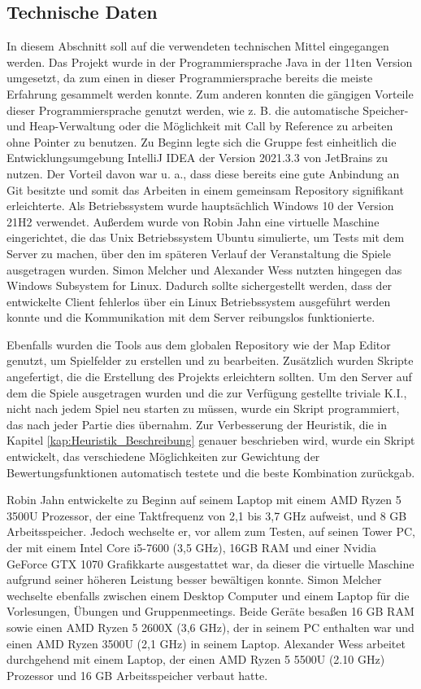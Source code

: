 \documentclass[12pt,a4paper,bibliography=totocnumbered,listof=totocnumbered]{article}
\begin{document}
\subsection{Technische Daten}
In diesem Abschnitt soll auf die verwendeten technischen Mittel eingegangen werden. Das Projekt wurde in der Programmiersprache Java in der 11ten Version umgesetzt, da zum einen in dieser Programmiersprache bereits die meiste Erfahrung gesammelt werden konnte. Zum anderen konnten die gängigen Vorteile dieser Programmiersprache genutzt werden, wie z. B. die automatische Speicher- und Heap-Verwaltung oder die Möglichkeit mit \glqq Call by Reference\grqq{} zu arbeiten ohne Pointer zu benutzen.
Zu Beginn legte sich die Gruppe fest einheitlich die Entwicklungsumgebung IntelliJ IDEA der Version 2021.3.3 von JetBrains zu nutzen. Der Vorteil davon war u. a., dass diese bereits eine gute Anbindung an Git besitzte und somit das Arbeiten in einem gemeinsam Repository signifikant erleichterte.
Als Betriebssystem wurde hauptsächlich Windows 10 der Version 21H2 verwendet. Außerdem wurde von Robin Jahn eine virtuelle Maschine eingerichtet, die das Unix Betriebssystem Ubuntu simulierte, um Tests mit dem Server zu machen, über den im späteren Verlauf der Veranstaltung die Spiele ausgetragen wurden. Simon Melcher und Alexander Wess nutzten hingegen das Windows Subsystem for Linux. Dadurch sollte sichergestellt werden, dass der entwickelte Client fehlerlos über ein Linux Betriebssystem ausgeführt werden konnte und die Kommunikation mit dem Server reibungslos funktionierte.

Ebenfalls wurden die Tools aus dem globalen Repository wie der Map Editor genutzt, um Spielfelder zu erstellen und zu bearbeiten. Zusätzlich wurden Skripte angefertigt, die die Erstellung des Projekts erleichtern sollten. Um den Server auf dem die Spiele ausgetragen wurden und die zur Verfügung gestellte triviale K.I., nicht nach jedem Spiel neu starten zu müssen, wurde ein Skript programmiert, das nach jeder Partie dies übernahm. Zur Verbesserung der Heuristik, die in Kapitel \ref{kap:Heuristik_Beschreibung} genauer beschrieben wird, wurde ein Skript entwickelt, das verschiedene Möglichkeiten zur Gewichtung der Bewertungsfunktionen automatisch testete und die beste Kombination zurückgab.

Robin Jahn entwickelte zu Beginn auf seinem Laptop mit einem AMD Ryzen 5 3500U Prozessor, der eine Taktfrequenz von 2,1 bis 3,7 GHz aufweist, und 8 GB Arbeitsspeicher. Jedoch wechselte er, vor allem zum Testen, auf seinen Tower PC, der mit einem Intel Core i5-7600 (3,5 GHz), 16GB RAM und einer Nvidia GeForce GTX 1070 Grafikkarte ausgestattet war, da dieser die virtuelle Maschine aufgrund seiner höheren Leistung besser bewältigen konnte. Simon Melcher wechselte ebenfalls zwischen einem Desktop Computer und einem Laptop für die Vorlesungen, Übungen und Gruppenmeetings. Beide Geräte besaßen 16 GB RAM sowie einen AMD Ryzen 5 2600X (3,6 GHz), der in seinem PC enthalten war und einen AMD Ryzen 3500U (2,1 GHz) in seinem Laptop. Alexander Wess arbeitet durchgehend mit einem Laptop, der einen AMD Ryzen 5 5500U (2.10 GHz) Prozessor und 16 GB Arbeitsspeicher verbaut hatte.
\end{document}
